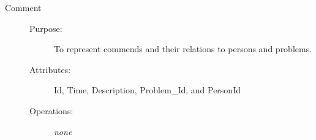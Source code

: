 \begin{description}
\item[Comment]\hfill
\begin{description}
	\item[Purpose:]To represent commends and their relations to persons and problems.
	\item[Attributes:]Id, Time, Description, Problem\_Id, and PersonId
	\item[Operations:]\textit{none}
\end{description}
\end{description}
